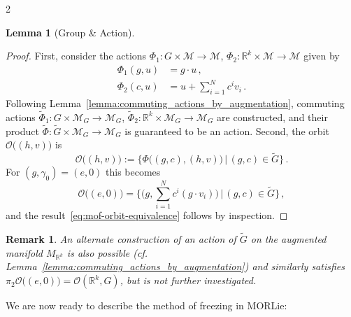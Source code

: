 \documentclass{article}
\newtheorem{proof}{Proof}[theorem]
\newtheorem{remark}[theorem]{Remark}
\newtheorem{lemma}[theorem]{Lemma}
\newcommand{\M}{\mathcal{M}}                                %
\newcommand{\R}{\mathbb{R}}                                 %
\begin{document}
\begin{multicols}{2}
\begin{lemma}[Group \& Action]
\end{lemma}
\begin{proof}
    First, consider the actions $\Phi_1:G\times\M \rightarrow\M$, $\Phi_2:\R^k\times\M \rightarrow\M$ given by 
    \begin{align}
        \Phi_1(g,u) &= g\cdot u\,,\\
        \Phi_2(c,u) &= u + \sum_{i=1}^N c^i v_i \,.
    \end{align}
    Following Lemma~\ref{lemma:commuting_actions_by_augmentation}, commuting actions $\widetilde{\Phi}_1:G \times \M_G \rightarrow \M_G$, $\widetilde{\Phi}_2: \R^k \times \M_G \rightarrow \M_G$ are constructed, and their product $\widetilde{\Phi}: \widetilde{G} \times \M_G \rightarrow \M_G$ is guaranteed to be an action.
    Second, the orbit $\mathcal{O}\big((h,v)\big)$ is 
    \begin{equation}
        \mathcal{O}\big((h,v)\big) := \big\{ \Phi\big((g,c),(h,v)\big) \,|\,  (g,c) \in \widetilde{G} \big\} \,.
    \end{equation}
    For $(g,\gamma_0) = (e,0)$ this becomes
    \begin{equation}
        \mathcal{O}\big((e,0)\big) = \bigg\{ (g, \sum_{i=1}^N c^i (g\cdot v_i)\big) \,|\,  (g,c) \in \widetilde{G} \bigg\}\,,
    \end{equation}
    and the result~\eqref{eq:mof-orbit-equivalence} follows by inspection.
\end{proof}
\begin{remark}
    An alternate construction of an action of $\widetilde{G}$ on the augmented manifold $M_{\R^k}$ is also possible (cf. Lemma~\ref{lemma:commuting_actions_by_augmentation}) and similarly satisfies $\pi_2 \mathcal{O}\big((e,0)\big) = \mathcal{O}(\R^k,G)$, but is not further investigated.
\end{remark}
We are now ready to describe the method of freezing in MORLie:



\end{multicols}
\end{document}
